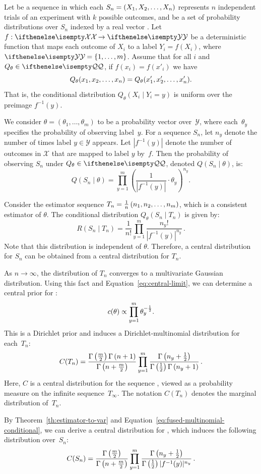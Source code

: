 \begin{example} \label{ex:fused-multinomial}
    \newcommand{\prodm}{\prod_{y=1}^m}
    \newcommand{\Qt}{Q_{\theta}}
    Let  be a sequence in which each $S_n = (\seqExp{X})$ represents $n$ independent trials of an
    experiment with $k$ possible outcomes,
    and \setQ be a set of probability distributions over $S_n$ indexed by a real vector \paramVal.
    Let $\maps[f]{X}{Y}$ be a deterministic function that maps each outcome of $X_i$
    to a label $Y_i = f(X_i)$, where $\set{Y} = \{1, \dots, m\}$.
    Assume that for all $i$ and $\Qt \in \setQ$, if $f(x_i) = f(x'_i)$ we have \[\Qt(\seqExp{x}) = \Qt(\seqExp{x'}).\]
    That is, the conditional distribution $\Qt(X_i \mid Y_i = y)$ is uniform over the preimage $f^{-1}(y)$.

    We consider $\theta = (\theta_1, \dots, \theta_m)$ to be a probability vector over~$\mathcal{Y}$,
    where each~$\theta_y$ specifies the probability of observing label~$y$.
    For a sequence $S_n$, let $n_y$ denote the number of times label $y \in \mathcal{Y}$ appears.
    Let $|f^{-1}(y)|$ denote the number of outcomes in $\mathcal{X}$ that are mapped to label $y$ by~$f$.
    Then the probability of observing $S_n$ under $\Qt \in \setQ$, denoted $Q(S_n \mid \theta)$, is:
    \[
        Q(S_n \mid \theta) = \prodm \left( \frac{1}{|f^{-1}(y)|} \cdot \theta_y \right)^{n_y}.
    \]

    Consider the estimator sequence $T_n = \frac{1}{n} \left( \seqExp[m]{n} \right)$, which is a consistent
    estimator of $\theta$.
    The conditional distribution $\Qt(S_n \mid T_n)$ is given by:
    \begin{equation}
        R(S_n \mid T_n) = \frac{1}{n!} \prodm \frac{n_y!}{|f^{-1}(y)|^{n_y}}\,.
        \label{eq:fused-multinomial-conditional}
    \end{equation}
    Note that this distribution is independent of $\theta$.
    Therefore, a central distribution for $S_n$ can be obtained from a
    central distribution for $T_n$.

    As $n \to \infty$, the distribution of $T_n$ converges to a multivariate Gaussian distribution.
    Using this fact and Equation~\ref{eq:central-limit}, we can determine a central prior for :
    \[
        c(\theta) \propto \prodm \theta_y^{-\hf}.
    \]
    This is a Dirichlet prior and induces a Dirichlet-multinomial distribution for each~$T_n$:
    \[
        C(T_n) = \frac{\gm{\hf[m]}\gm{n+1}}{\gm{n + \hf[m]}}
        \prodm \frac{\gm{n_y + \hf}}{\gm{\hf}\gm{n_y+1}}\,.
    \]
    Here, $C$ is a central distribution for the sequence , viewed as a probability measure on the
    infinite sequence~$T_\infty$.
    The notation $C(T_n)$ denotes the marginal distribution of~$T_n$.

    By Theorem~\ref{th:estimator-to-var} and Equation~\ref{eq:fused-multinomial-conditional}, we can derive a
    central distribution for , which induces the following distribution over~$S_n$:
    \[
        C(S_n) = \frac{\gm{\hf[m]}}{\gm{n + \hf[m]}}
        \prodm \frac{\gm{n_y + \hf}}{\gm{\hf} |f^{-1}(y)|^{n_y}}\,.
    \]
\end{example}


